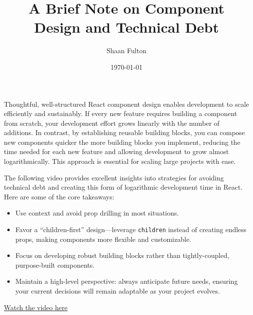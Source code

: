 \documentclass{article}
\title{A Brief Note on Component Design and Technical Debt}
\author{Shaan Fulton}
\date{\today}
\begin{document}
\maketitle

Thoughtful, well-structured React component design enables development to scale efficiently and sustainably. If every new feature requires building a component from scratch, your development effort grows linearly with the number of additions. In contrast, by establishing reusable building blocks, you can compose new components quicker the more building blocks you implement, reducing the time needed for each new feature and allowing development to grow almost logarithmically. This approach is essential for scaling large projects with ease.

The following video provides excellent insights into strategies for avoiding technical debt and creating this form of logarithmic development time in React. Here are some of the core takeaways:

\begin{itemize}
    \item Use context and avoid prop drilling in most situations.
    \item Favor a “children-first” design—leverage \texttt{children} instead of creating endless props, making components more flexible and customizable.
    \item Focus on developing robust building blocks rather than tightly-coupled, purpose-built components.
    \item Maintain a high-level perspective: always anticipate future needs, ensuring your current decisions will remain adaptable as your project evolves.
\end{itemize}

\noindent
\href{https://www.youtube.com/watch?v=n62Pc4KV4SM}{Watch the video here}
\end{document}
